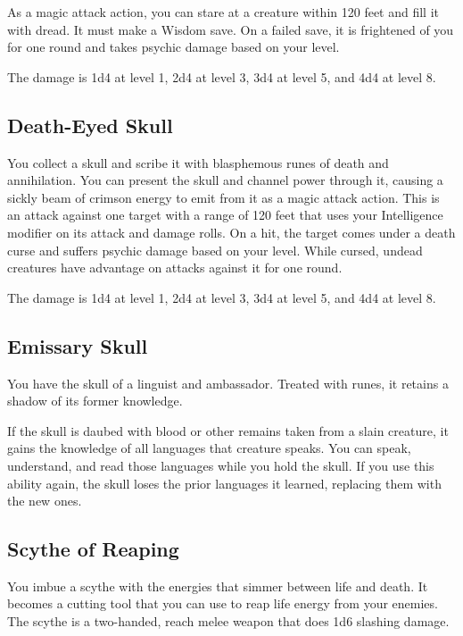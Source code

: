 \documentclass[12pt,letterpaper,twocolumn,openany,nodeprecatedcode,bg=none]{dndbook}
\begin{document}
As a magic attack action, you can stare at a creature within 120 feet
and fill it with dread. It must make a Wisdom save. On a failed save, it
is frightened of you for one round and takes psychic damage based on
your level.

The damage is 1d4 at level 1, 2d4 at level 3, 3d4 at level 5, and 4d4 at
level 8.

\subsection{Death-Eyed Skull}\label{death-eyed-skull}

You collect a skull and scribe it with blasphemous runes of death and
annihilation. You can present the skull and channel power through it,
causing a sickly beam of crimson energy to emit from it as a magic
attack action. This is an attack against one target with a range of 120
feet that uses your Intelligence modifier on its attack and damage
rolls. On a hit, the target comes under a death curse and suffers
psychic damage based on your level. While cursed, undead creatures have
advantage on attacks against it for one round.

The damage is 1d4 at level 1, 2d4 at level 3, 3d4 at level 5, and 4d4 at
level 8.

\subsection{Emissary Skull}\label{emissary-skull}

You have the skull of a linguist and ambassador. Treated with runes, it
retains a shadow of its former knowledge.

If the skull is daubed with blood or other remains taken from a slain
creature, it gains the knowledge of all languages that creature speaks.
You can speak, understand, and read those languages while you hold the
skull. If you use this ability again, the skull loses the prior
languages it learned, replacing them with the new ones.

\subsection{Scythe of Reaping}\label{scythe-of-reaping}

You imbue a scythe with the energies that simmer between life and death.
It becomes a cutting tool that you can use to reap life energy from your
enemies. The scythe is a two-handed, reach melee weapon that does 1d6
slashing damage.
\end{document}
